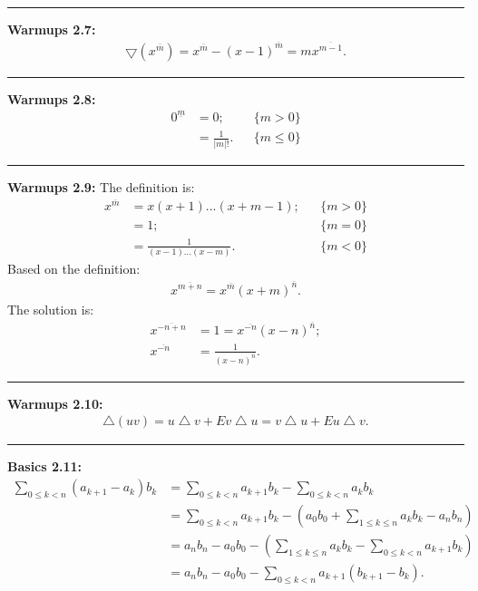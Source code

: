 \documentclass{article}
\begin{document}
\noindent\rule{\textwidth}{0.4pt}
\textbf{Warmups 2.7:}
\begin{align}
\bigtriangledown (x^{\overline m}) = x^{\overline m} - (x-1)^{\overline m} = m x^{\overline {m-1}}.
\end{align}

\noindent\rule{\textwidth}{0.4pt}
\textbf{Warmups 2.8:}
\begin{align}
0^{\underline m} &= 0; && \{m > 0\}\\
		 &= \frac{1}{|m|!}. &&\{m \le 0\}
\end{align}


\noindent\rule{\textwidth}{0.4pt}
\textbf{Warmups 2.9:}
The definition is:
\begin{align}
x^{\overline m} &= x(x+1)...(x+m-1); && \{m > 0\}\\
		&= 1; &&\{m = 0\}\\
		&= \frac{1}{(x-1)...(x-m)}. &&\{m < 0\}
\end{align}
Based on the definition:
\begin{align}
x^{\overline {m+n}} = x^{\overline m}(x+m)^{\overline n}.
\end{align}
The solution is:
\begin{align}
x^{\overline {-n + n}} &= 1 = x^{\overline {-n}}(x-n)^{\overline n};\\
x^{\overline {-n}} &= \frac{1}{(x-n)^{\overline n}}.
\end{align}

\noindent\rule{\textwidth}{0.4pt}
\textbf{Warmups 2.10:}
\begin{align}
\bigtriangleup (uv) = u\bigtriangleup v + Ev\bigtriangleup u = v\bigtriangleup u + Eu\bigtriangleup v.
\end{align}

\noindent\rule{\textwidth}{0.4pt}
\textbf{Basics 2.11:}
\begin{align}
\sum_{0 \le k < n} (a_{k+1} - a_k) b_k &= \sum_{0 \le k < n} a_{k+1}b_k - \sum_{0 \le k < n} a_k b_k \\
				       &= \sum_{0 \le k < n} a_{k+1}b_k - (a_0 b_0 + \sum_{1 \le k \le n} a_k b_k - a_n b_n) \\
				       &= a_n b_n - a_0 b_0 - (\sum_{1 \le k \le n} a_k b_k - \sum_{0 \le k < n} a_{k+1}b_k) \\
				       &= a_n b_n - a_0 b_0 - \sum_{0 \le k < n} a_{k+1}(b_{k+1} - b_{k}).
\end{align}
\end{document}
